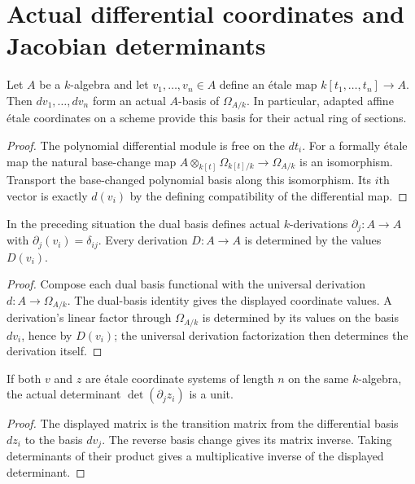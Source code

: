 \section{Actual differential coordinates and Jacobian determinants}

\begin{lemma}\label{lem:sc0-etale-differential-basis}
\leanok
Let $A$ be a $k$-algebra and let $v_1,\ldots,v_n\in A$ define an \'etale map
$k[t_1,\ldots,t_n]\to A$. Then $dv_1,\ldots,dv_n$ form an actual $A$-basis of
$\Omega_{A/k}$. In particular, adapted affine \'etale coordinates on a scheme
provide this basis for their actual ring of sections.
\end{lemma}
\begin{proof}
The polynomial differential module is free on the $dt_i$. For a formally \'etale
map the natural base-change map
$A\otimes_{k[t]}\Omega_{k[t]/k}\to\Omega_{A/k}$ is an isomorphism. Transport the
base-changed polynomial basis along this isomorphism. Its $i$th vector is exactly
$d(v_i)$ by the defining compatibility of the differential map.
\end{proof}

\begin{lemma}\label{lem:sc0-etale-partial-derivatives}
\leanok
{}
In the preceding situation the dual basis defines actual $k$-derivations
$\partial_j:A\to A$ with $\partial_j(v_i)=\delta_{ij}$. Every derivation
$D:A\to A$ is determined by the values $D(v_i)$.
\end{lemma}
\begin{proof}
Compose each dual basis functional with the universal derivation $d:A\to\Omega_{A/k}$.
The dual-basis identity gives the displayed coordinate values. A derivation's
linear factor through $\Omega_{A/k}$ is determined by its values on the basis
$dv_i$, hence by $D(v_i)$; the universal derivation factorization then determines
the derivation itself.
\end{proof}

\begin{lemma}\label{lem:sc0-etale-unit-jacobian}
\leanok
{}
If both $v$ and $z$ are \'etale coordinate systems of length $n$ on the same
$k$-algebra, the actual determinant $\det(\partial_j z_i)$ is a unit.
\end{lemma}
\begin{proof}
The displayed matrix is the transition matrix from the differential basis $dz_i$
to the basis $dv_j$. The reverse basis change gives its matrix inverse. Taking
determinants of their product gives a multiplicative inverse of the displayed
determinant.
\end{proof}
